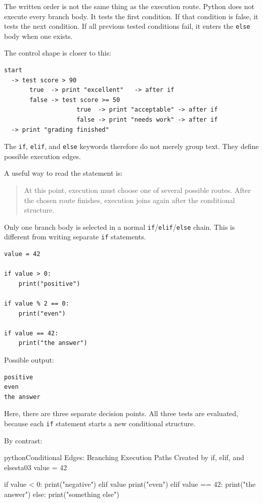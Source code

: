 The written order is not the same thing as the execution route. Python does not execute every branch body. It tests the first condition. If that condition is false, it tests the next condition. If all previous tested conditions fail, it enters the \texttt{else} body when one exists.

The control shape is closer to this:

\begin{verbatim}
start
  -> test score > 90
       true  -> print "excellent"   -> after if
       false -> test score >= 50
                    true  -> print "acceptable" -> after if
                    false -> print "needs work" -> after if
  -> print "grading finished"
\end{verbatim}

The \texttt{if}, \texttt{elif}, and \texttt{else} keywords therefore do not merely group text. They define possible execution edges.

A useful way to read the statement is:

\begin{quote}
At this point, execution must choose one of several possible routes. After the chosen route finishes, execution joins again after the conditional structure.
\end{quote}

Only one branch body is selected in a normal \texttt{if}/\texttt{elif}/\texttt{else} chain. This is different from writing separate \texttt{if} statements.

\begin{verbatim}
value = 42

if value > 0:
    print("positive")

if value % 2 == 0:
    print("even")

if value == 42:
    print("the answer")
\end{verbatim}

Possible output:

\begin{verbatim}
positive
even
the answer
\end{verbatim}

Here, there are three separate decision points. All three tests are evaluated, because each \texttt{if} statement starts a new conditional structure.

By contrast:

\begin{codebox}[]{python}{Conditional Edges: Branching Execution Paths Created by if, elif, and else}{sta03}
value = 42

if value < 0:
    print("negative")
elif value %
    print("even")
elif value == 42:
    print("the answer")
else:
    print("something else")
\end{codebox}



